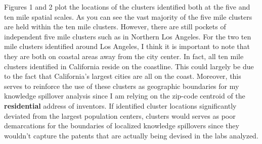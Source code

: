 \documentclass[12pt,letterpaper]{article}
\begin{document}
Figures 1 and 2 plot the locations of the clusters identified both at the five and ten mile spatial scales. As you can see the vast majority of the five mile clusters are held within the ten mile clusters. However, there are still pockets of independent five mile clusters such as in Northern Los Angeles. For the two ten mile clusters identified around Los Angeles, I think it is important to note that they are both on coastal areas away from the city center. In fact, all ten mile clusters identified in California reside on the coastline. This could largely be due to the fact that California's largest cities are all on the coast. Moreover, this serves to reinforce the use of these clusters as geographic boundaries for my knowledge spillover analysis since I am relying on the zip-code centroid of the \textbf{residential} address of inventors. If identified cluster locations significantly deviated from the largest population centers, clusters would serves as poor demarcations for the boundaries of localized knowledge spillovers since they wouldn't capture the patents that are actually being devised in the labs analyzed. 
\end{document}
